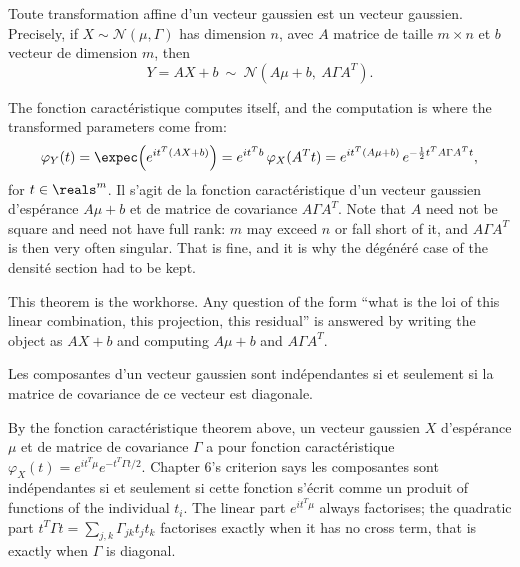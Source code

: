 \begin{theorem}
Toute transformation affine d'un vecteur gaussien est un vecteur gaussien.
Precisely, if $X \sim \mathcal{N}(\mu,\Gamma)$ has dimension $n$, avec $A$
matrice de taille $m \times n$ et $b$ vecteur de dimension $m$, then
\[
  Y = AX + b \ \sim\ \mathcal{N}\!\left(A\mu + b,\ A\Gamma A^{T}\right) .
\]
\end{theorem}

\begin{remark}
The fonction caractéristique computes itself, and the computation is where the
transformed parameters come from:
\[
  \varphi_{Y}(t) = \expec\!\left(e^{it^{T}(AX+b)}\right)
                 = e^{it^{T}b}\,\varphi_{X}(A^{T}t)
                 = e^{it^{T}(A\mu + b)}\, e^{-\frac{1}{2}t^{T}A\Gamma A^{T}t} ,
\]
for $t \in \reals^{m}$. Il s'agit de la fonction caractéristique d'un vecteur
gaussien d'espérance $A\mu + b$ et de matrice de covariance $A\Gamma A^{T}$. Note
that $A$ need not be square and need not have full rank: $m$ may exceed $n$ or
fall short of it, and $A\Gamma A^{T}$ is then very often singular. That is fine,
and it is why the dégénéré case of the densité section had to be kept.
\end{remark}

This theorem is the workhorse. Any question of the form ``what is the
loi of this linear combination, this projection, this residual'' is
answered by writing the object as $AX + b$ and computing $A\mu + b$ and $A\Gamma A^{T}$.

\begin{theorem}
Les composantes d'un vecteur gaussien sont indépendantes si et seulement si la
matrice de covariance de ce vecteur est diagonale.
\end{theorem}

\begin{remark}
By the fonction caractéristique theorem above, un vecteur gaussien $X$
d'espérance $\mu$ et de matrice de covariance $\Gamma$ a pour fonction
caractéristique $\varphi_{X}(t) = e^{it^{T}\mu}e^{-t^{T}\Gamma t/2}$. Chapter 6's
criterion says les composantes sont indépendantes si et seulement si cette
fonction s'écrit comme un produit of functions of the individual $t_{i}$. The
linear part $e^{it^{T}\mu}$ always
factorises; the quadratic part $t^{T}\Gamma t = \sum_{j,k}\Gamma_{jk}t_{j}t_{k}$
factorises exactly when it has no cross term, that is exactly when $\Gamma$ is
diagonal.
\end{remark}


